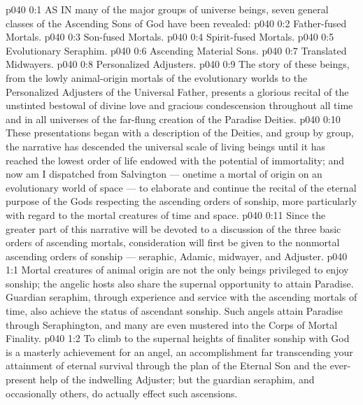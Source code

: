 \vs p040 0:1 AS IN many of the major groups of universe beings, seven general classes of the Ascending Sons of God have been revealed:
\vs p040 0:2 \bibnobreakspace Father\hyp{}fused Mortals.
\vs p040 0:3 \bibnobreakspace Son\hyp{}fused Mortals.
\vs p040 0:4 \bibnobreakspace Spirit\hyp{}fused Mortals.
\vs p040 0:5 \bibnobreakspace Evolutionary Seraphim.
\vs p040 0:6 \bibnobreakspace Ascending Material Sons.
\vs p040 0:7 \bibnobreakspace Translated Midwayers.
\vs p040 0:8 \bibnobreakspace Personalized Adjusters.
\vs p040 0:9 \pc The story of these beings, from the lowly animal\hyp{}origin mortals of the evolutionary worlds to the Personalized Adjusters of the Universal Father, presents a glorious recital of the unstinted bestowal of divine love and gracious condescension throughout all time and in all universes of the far\hyp{}flung creation of the Paradise Deities.
\vs p040 0:10 These presentations began with a description of the Deities, and group by group, the narrative has descended the universal scale of living beings until it has reached the lowest order of life endowed with the potential of immortality; and now am I dispatched from Salvington --- onetime a mortal of origin on an evolutionary world of space --- to elaborate and continue the recital of the eternal purpose of the Gods respecting the ascending orders of sonship, more particularly with regard to the mortal creatures of time and space.
\vs p040 0:11 Since the greater part of this narrative will be devoted to a discussion of the three basic orders of ascending mortals, consideration will first be given to the nonmortal ascending orders of sonship --- seraphic, Adamic, midwayer, and Adjuster.
\vs p040 1:1 Mortal creatures of animal origin are not the only beings privileged to enjoy sonship; the angelic hosts also share the supernal opportunity to attain Paradise. Guardian seraphim, through experience and service with the ascending mortals of time, also achieve the status of ascendant sonship. Such angels attain Paradise through Seraphington, and many are even mustered into the Corps of Mortal Finality.
\vs p040 1:2 To climb to the supernal heights of finaliter sonship with God is a masterly achievement for an angel, an accomplishment far transcending your attainment of eternal survival through the plan of the Eternal Son and the ever\hyp{}present help of the indwelling Adjuster; but the guardian seraphim, and occasionally others, do actually effect such ascensions.
